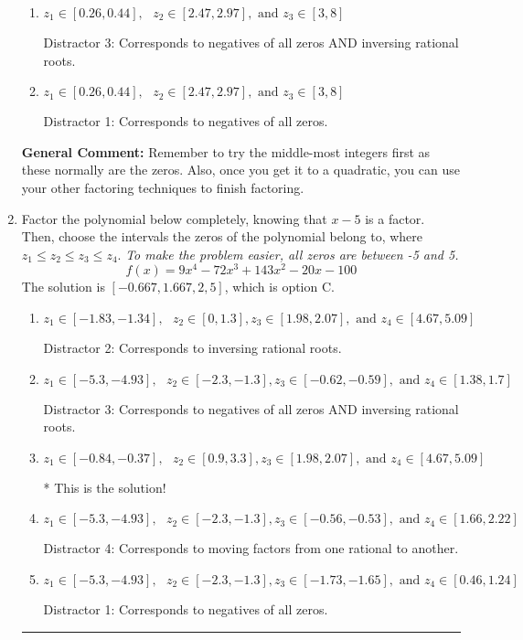 \documentclass{extbook}[14pt]
\newcommand{\litem}[1]{\item #1

\rule{\textwidth}{0.4pt}}
\begin{document}
\begin{enumerate}
{\begin{enumerate}[label=\Alph*.]
* This is the solution!
\item \( z_1 \in [0.26, 0.44], \text{   }  z_2 \in [2.47, 2.97], \text{   and   } z_3 \in [3, 8] \)

 Distractor 3: Corresponds to negatives of all zeros AND inversing rational roots.
\item \( z_1 \in [0.26, 0.44], \text{   }  z_2 \in [2.47, 2.97], \text{   and   } z_3 \in [3, 8] \)

 Distractor 1: Corresponds to negatives of all zeros.
\end{enumerate}

\textbf{General Comment:} Remember to try the middle-most integers first as these normally are the zeros. Also, once you get it to a quadratic, you can use your other factoring techniques to finish factoring.
}
\litem{
Factor the polynomial below completely, knowing that $x -5$ is a factor. Then, choose the intervals the zeros of the polynomial belong to, where $z_1 \leq z_2 \leq z_3 \leq z_4$. \textit{To make the problem easier, all zeros are between -5 and 5.}
\[ f(x) = 9x^{4} -72 x^{3} +143 x^{2} -20 x -100 \]The solution is \( [-0.667, 1.667, 2, 5] \), which is option C.\begin{enumerate}[label=\Alph*.]
\item \( z_1 \in [-1.83, -1.34], \text{   }  z_2 \in [0, 1.3], z_3 \in [1.98, 2.07], \text{   and   } z_4 \in [4.67, 5.09] \)

 Distractor 2: Corresponds to inversing rational roots.
\item \( z_1 \in [-5.3, -4.93], \text{   }  z_2 \in [-2.3, -1.3], z_3 \in [-0.62, -0.59], \text{   and   } z_4 \in [1.38, 1.7] \)

 Distractor 3: Corresponds to negatives of all zeros AND inversing rational roots.
\item \( z_1 \in [-0.84, -0.37], \text{   }  z_2 \in [0.9, 3.3], z_3 \in [1.98, 2.07], \text{   and   } z_4 \in [4.67, 5.09] \)

* This is the solution!
\item \( z_1 \in [-5.3, -4.93], \text{   }  z_2 \in [-2.3, -1.3], z_3 \in [-0.56, -0.53], \text{   and   } z_4 \in [1.66, 2.22] \)

 Distractor 4: Corresponds to moving factors from one rational to another.
\item \( z_1 \in [-5.3, -4.93], \text{   }  z_2 \in [-2.3, -1.3], z_3 \in [-1.73, -1.65], \text{   and   } z_4 \in [0.46, 1.24] \)

 Distractor 1: Corresponds to negatives of all zeros.
\end{enumerate}

}
\end{enumerate}
\end{document}

